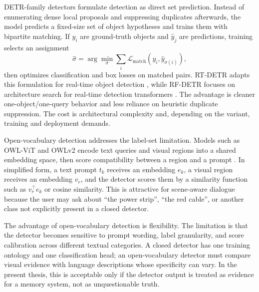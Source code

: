 DETR-family detectors formulate detection as direct set prediction. Instead of enumerating dense local proposals and suppressing duplicates afterwards, the model predicts a fixed-size set of object hypotheses and trains them with bipartite matching. If \(y_i\) are ground-truth objects and \(\hat{y}_j\) are predictions, training selects an assignment
\[
\hat{\sigma}=\arg\min_{\sigma}\sum_i \mathcal{L}_{\mathrm{match}}(y_i,\hat{y}_{\sigma(i)}),
\]
then optimizes classification and box losses on matched pairs. RT-DETR adapts this formulation for real-time object detection \cite{zhao_detrs_2024}, while RF-DETR focuses on architecture search for real-time detection transformers \cite{robinson_rf-detr_2026}. The advantage is cleaner one-object/one-query behavior and less reliance on heuristic duplicate suppression. The cost is architectural complexity and, depending on the variant, training and deployment demands.

Open-vocabulary detection addresses the label-set limitation. Models such as OWL-ViT and OWLv2 encode text queries and visual regions into a shared embedding space, then score compatibility between a region and a prompt \cite{minderer_simple_2022,minderer_scaling_2024}. In simplified form, a text prompt \(t_k\) receives an embedding \(e_k\), a visual region receives an embedding \(v_r\), and the detector scores them by a similarity function such as \(v_r^\top e_k\) or cosine similarity. This is attractive for scene-aware dialogue because the user may ask about \enquote{the power strip}, \enquote{the red cable}, or another class not explicitly present in a closed detector.

The advantage of open-vocabulary detection is flexibility. The limitation is that the detector becomes sensitive to prompt wording, label granularity, and score calibration across different textual categories. A closed detector has one training ontology and one classification head; an open-vocabulary detector must compare visual evidence with language descriptions whose specificity can vary. In the present thesis, this is acceptable only if the detector output is treated as evidence for a memory system, not as unquestionable truth.

